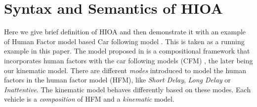  \section{Syntax and Semantics of HIOA}
Here we give brief definition of HIOA and then demonstrate it with an example of Human Factor model \citep{Ro2018} based Car following model \citep{bevrani2012evaluation}. This is taken as a running example in this paper. 
The model proposed in \citep{Ro2018} is a compositional framework that incorporates human factors with the car following models (CFM) \citep{bevrani2012evaluation}, the later being our kinematic model. There are different \textit{modes} introduced to model the human factors in the human factor model (HFM), like \textit{Short Delay}, \textit{Long Delay} or \textit{Inattentive}. The kinematic model behaves differently based on these modes.  Each vehicle is a \textit{composition} of HFM and a \textit{kinematic} model. 
